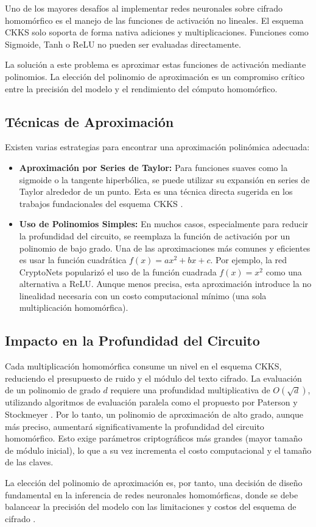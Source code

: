 Uno de los mayores desafíos al implementar redes neuronales sobre cifrado homomórfico es el manejo de las funciones de activación no lineales. El esquema CKKS solo soporta de forma nativa adiciones y multiplicaciones. Funciones como Sigmoide, Tanh o ReLU no pueden ser evaluadas directamente.

La solución a este problema es aproximar estas funciones de activación mediante polinomios. La elección del polinomio de aproximación es un compromiso crítico entre la precisión del modelo y el rendimiento del cómputo homomórfico.

\subsection{Técnicas de Aproximación}

Existen varias estrategias para encontrar una aproximación polinómica adecuada:

\begin{itemize}
    \item \textbf{Aproximación por Series de Taylor:} Para funciones suaves como la sigmoide o la tangente hiperbólica, se puede utilizar su expansión en series de Taylor alrededor de un punto. Esta es una técnica directa sugerida en los trabajos fundacionales del esquema CKKS \cite{CKKS17}.

    \item \textbf{Uso de Polinomios Simples:} En muchos casos, especialmente para reducir la profundidad del circuito, se reemplaza la función de activación por un polinomio de bajo grado. Una de las aproximaciones más comunes y eficientes es usar la función cuadrática $f(x) = ax^2 + bx + c$. Por ejemplo, la red CryptoNets \cite{GiladBachrach2016CryptoNets} popularizó el uso de la función cuadrada $f(x) = x^2$ como una alternativa a ReLU. Aunque menos precisa, esta aproximación introduce la no linealidad necesaria con un costo computacional mínimo (una sola multiplicación homomórfica).
\end{itemize}

\subsection{Impacto en la Profundidad del Circuito}

Cada multiplicación homomórfica consume un nivel en el esquema CKKS, reduciendo el presupuesto de ruido y el módulo del texto cifrado. La evaluación de un polinomio de grado $d$ requiere una profundidad multiplicativa de $O(\sqrt d)$, utilizando algoritmos de evaluación paralela como el propuesto por Paterson y Stockmeyer \cite{Paterson1973}. Por lo tanto, un polinomio de aproximación de alto grado, aunque más preciso, aumentará significativamente la profundidad del circuito homomórfico. Esto exige parámetros criptográficos más grandes (mayor tamaño de módulo inicial), lo que a su vez incrementa el costo computacional y el tamaño de las claves.

La elección del polinomio de aproximación es, por tanto, una decisión de diseño fundamental en la inferencia de redes neuronales homomórficas, donde se debe balancear la precisión del modelo con las limitaciones y costos del esquema de cifrado \cite{benaissa2021tenseal}.
